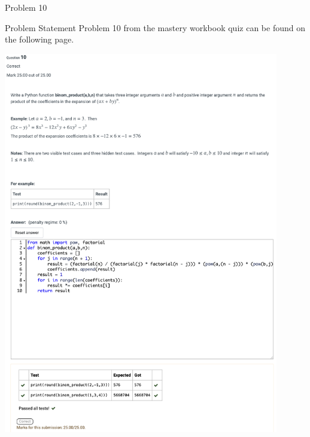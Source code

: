\begin{problem}{Problem 10}
    \begin{statement}{Problem Statement}
        Problem 10 from the mastery workbook quiz can be found on the following page.
    \end{statement}
    \begin{highlight}[Solution]
        \begin{center}
            \includegraphics[width = 0.90\textwidth]{Images/Problem 10.png}
        \end{center}
    \end{highlight}
\end{problem}

